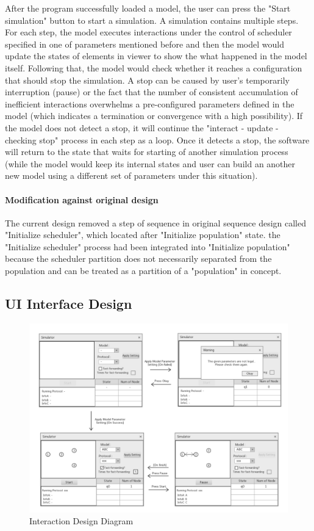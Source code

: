 \par\noindent
After the program successfully loaded a model, the user can press the "Start simulation"
button to start a simulation. A simulation contains multiple steps. For each step,
the model executes interactions under the control of scheduler specified in one
of parameters mentioned before and then the model would update the states of elements
 in viewer to show the what happened in the model itself. Following that, the model would
 check whether it reaches a configuration that should stop the simulation. A stop can be caused
 by user's temporarily interruption (pause) or the fact that the number of consistent accumulation of
 inefficient interactions overwhelms a pre-configured parameters defined in the model (which indicates
 a termination or convergence with a high possibility). If the model does not detect a stop,
 it will continue the "interact - update - checking stop" process in each step as a loop. Once it detects a
 stop, the software will return to the state that waits for starting of another simulation process
 (while the model would keep its internal states and user can build an another new model using a different set of parameters under this situation).

 \paragraph{Modification against original design}
The current design removed a step of sequence in original sequence design called "Initialize scheduler", which located after "Initialize population" state.
the "Initialize scheduler" process had been integrated into "Initialize population" because
the scheduler partition does not necessarily separated from the population and can be treated as a partition of a "population" in concept.

\subsection{UI Interface Design}
\begin{figure}[H]
\begin{center}
\includegraphics[width =\textwidth]{context/diagram/interface.pdf}
\caption{Interaction Design Diagram}
\label{intefaceG}
\end{center}
\end{figure}

